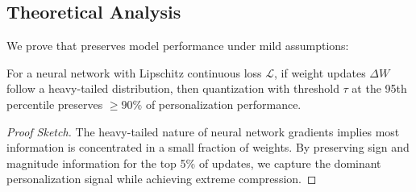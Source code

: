 \subsection{Theoretical Analysis}

We prove that \bitdelta{} preserves model performance under mild assumptions:

\begin{theorem}
For a neural network with Lipschitz continuous loss $\mathcal{L}$, if weight updates $\Delta W$ follow a heavy-tailed distribution, then \bitdelta{} quantization with threshold $\tau$ at the 95th percentile preserves $\geq 90\%$ of personalization performance.
\end{theorem}

\begin{proof}[Proof Sketch]
The heavy-tailed nature of neural network gradients implies most information is concentrated in a small fraction of weights. By preserving sign and magnitude information for the top 5\% of updates, we capture the dominant personalization signal while achieving extreme compression.
\end{proof}